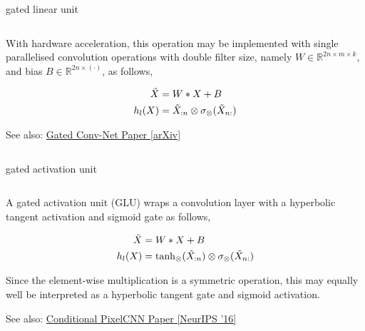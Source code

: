 \documentclass[aspectratio=169,xcolor={dvipsnames,svgnames}]{beamer}
\begin{document}
\begin{frame}[label={sec:org2e52b70}]{gated linear unit}
\begin{columns}
\begin{column}{0.45\columnwidth}
With hardware acceleration, this operation may be
implemented with single parallelised convolution
operations with double filter size, namely
\(W\in\mathbb{R}^{2n\times m\times k}\), and bias
\(B\in\mathbb{R}^{2n\times(\cdot)}\), as follows,

\begin{align}
  \notag
  \tilde{X} &= W*X+B \\
  \notag
  h_l(X) &= \tilde{X}_{:n} \otimes \sigma_{\otimes}
           (\tilde{X}_{n:})
\end{align}

\alert{See also:} \href{https://arxiv.org/abs/1612.08083}{Gated Conv-Net Paper [arXiv]​}
\end{column}
\end{columns}
\end{frame}

\begin{frame}[label={sec:gated-activation-unit}]{gated activation unit}
\begin{columns}
\begin{column}{0.7\columnwidth}
A gated activation unit (GLU) wraps a convolution layer
with a hyperbolic tangent activation and sigmoid gate
as follows,

\begin{align}
  \notag
  \tilde{X} &= W*X+B \\
  \notag
  h_l(X) &= \tanh_{\otimes} (\tilde{X}_{:n}) \otimes
           \sigma_{\otimes} (\tilde{X}_{n:}) 
\end{align}

Since the element-wise multiplication is a symmetric
operation, this may equally well be interpreted as a
hyperbolic tangent gate and sigmoid activation.

\alert{See also:} \href{https://proceedings.neurips.cc/paper\_files/paper/2016/hash/b1301141feffabac455e1f90a7de2054-Abstract.html}{Conditional PixelCNN Paper [NeurIPS '16]​}
\end{column}
\end{columns}
\end{frame}
\end{document}
